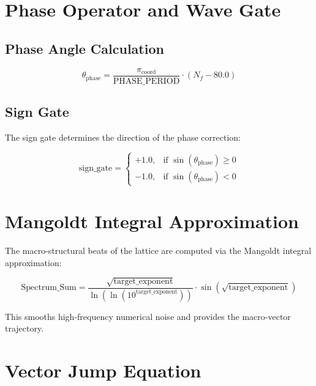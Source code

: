\documentclass[12pt,a4paper]{article}
\newcommand{\PHASE}{\text{PHASE\_PERIOD}}
\newcommand{\picoord}{\pi_{\text{coord}}}
\begin{document}
	\section{Phase Operator and Wave Gate}
	
	\subsection{Phase Angle Calculation}
	
	\begin{equation}
		\theta_{\text{phase}} = \frac{\picoord}{\PHASE} \cdot (N_f - 80.0)
		\label{eq:phase-angle}
	\end{equation}
	
	\subsection{Sign Gate}
	
	The sign gate determines the direction of the phase correction:
	
	\begin{equation}
		\text{sign\_gate} = \begin{cases}
			+1.0, & \text{if } \sin(\theta_{\text{phase}}) \ge 0 \\
			-1.0, & \text{if } \sin(\theta_{\text{phase}}) < 0
		\end{cases}
		\label{eq:sign-gate}
	\end{equation}
	
	\section{Mangoldt Integral Approximation}
	
	The macro-structural beats of the lattice are computed via the Mangoldt integral approximation:
	
	\begin{equation}
		\text{Spectrum\_Sum} = \frac{\sqrt{\text{target\_exponent}}}{\ln(\ln(10^{\text{target\_exponent}}))} \cdot \sin\left(\sqrt{\text{target\_exponent}}\right)
		\label{eq:spectrum}
	\end{equation}
	
	This smooths high-frequency numerical noise and provides the macro-vector trajectory.
	
	\section{Vector Jump Equation}
	
\end{document}
